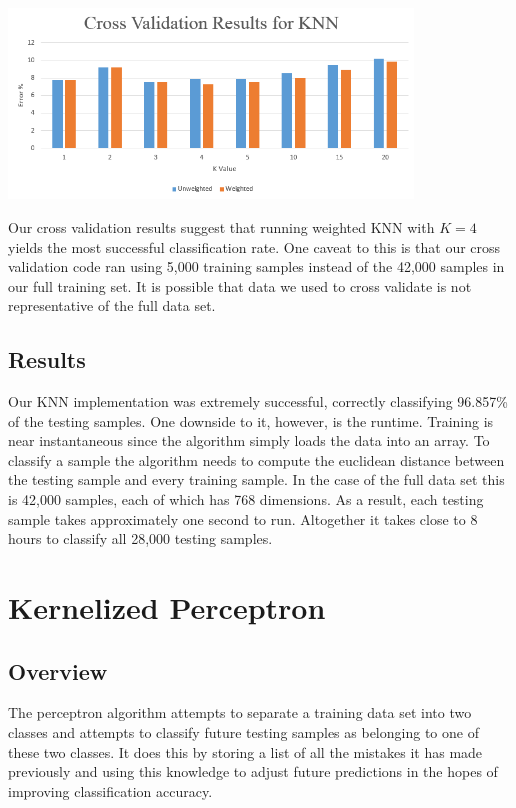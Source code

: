 \documentclass{article} %
\begin{document}
\begin{center}
\includegraphics[width=406px]{KNN_CrossValidation.png}
\end{center}

Our cross validation results suggest that running weighted KNN with $K = 4$
yields the most successful classification rate. One caveat to this is that our
cross validation code ran using 5,000 training samples instead of the 42,000
samples in our full training set. It is possible that data we used to cross
validate is not representative of the full data set.

\subsection{Results}

Our KNN implementation was extremely successful, correctly classifying 96.857\%
of the testing samples. One downside to it, however, is the runtime. Training is
near instantaneous since the algorithm simply loads the data into an array. To
classify a sample the algorithm needs to compute the euclidean distance between
the testing sample and every training sample. In the case of the full data set
this is 42,000 samples, each of which has 768 dimensions. As a result, each
testing sample takes approximately one second to run. Altogether it takes close
to 8 hours to classify all 28,000 testing samples.

\section{Kernelized Perceptron}
\subsection{Overview}

The perceptron algorithm attempts to separate a training data set into two
classes and attempts to classify future testing samples as belonging to one of
these two classes. It does this by storing a list of all the mistakes it has
made previously and using this knowledge to adjust future predictions in the
hopes of improving classification accuracy. 
\end{document}
